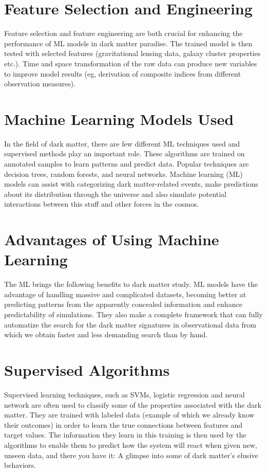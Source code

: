 \section{Feature Selection and Engineering}

Feature selection and feature engineering are both crucial for enhancing the performance of ML models in dark matter paradise. The trained model is then tested with selected features (gravitational lensing data, galaxy cluster properties etc.). Time and space transformation of the raw data can produce new variables to improve model results (eg, derivation of composite indices from different observation measures).

\section{Machine Learning Models Used}

In the field of dark matter, there are few different ML techniques used and supervised methods play an important role. These algorithms are trained on annotated samples to learn patterns and predict data. Popular techniques are decision trees, random forests, and neural networks. Machine learning (ML) models can assist with categorizing dark matter-related events, make predictions about its distribution through the universe and also simulate potential interactions between this stuff and other forces in the cosmos.

\section{Advantages of Using Machine Learning}

The ML brings the following benefits to dark matter study. ML models have the advantage of handling massive and complicated datasets, becoming better at predicting patterns from the apparently concealed information and enhance predictability of simulations. They also make a complete framework that can fully automatize the search for the dark matter signatures in observational data from which we obtain faster and less demanding search than by hand.

\section{Supervised Algorithms}

Supervised learning techniques, such as SVMs, logistic regression and neural network are often used to classify some of the properties associated with the dark matter. They are trained with labeled data (example of which we already know their outcomes) in order to learn the true connections between features and target values. The information they learn in this training is then used by the algorithms to enable them to predict how the system will react when given new, unseen data, and there you have it: A glimpse into some of dark matter’s elusive behaviors.
 
